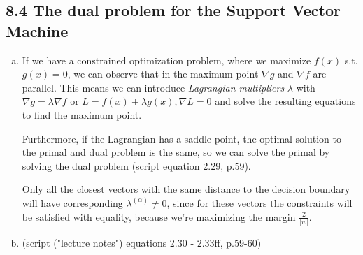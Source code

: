 \documentclass[10pt,a4paper]{article}
\begin{document}
\subsection*{8.4 The dual problem for the Support Vector Machine}
\begin{enumerate}[a)]
\item
If we have a constrained optimization problem, where we maximize $f(x)$ s.t. $g(x)=0$, we can observe that in the maximum point $\nabla g$ and $\nabla f$ are parallel. This means we can introduce {\em Lagrangian multipliers} $\lambda$ with $\nabla g = \lambda \nabla f$ or $L = f(x) + \lambda g(x), \nabla L = 0$ and solve the resulting equations to find the maximum point.

 Furthermore, if the Lagrangian has a saddle point, the optimal solution to the primal and dual problem is the same, so we can solve the primal by solving the dual problem (script equation 2.29, p.59).



Only all the closest vectors with the same distance to the decision boundary will have corresponding $\lambda^{(\alpha)} \not= 0$, since for these vectors the constraints will be satisfied with equality, because we're maximizing the margin $\frac{2}{|w|}$.

\item
(script ("lecture notes") equations 2.30 - 2.33ff, p.59-60)

\end{enumerate}


\end{document}
